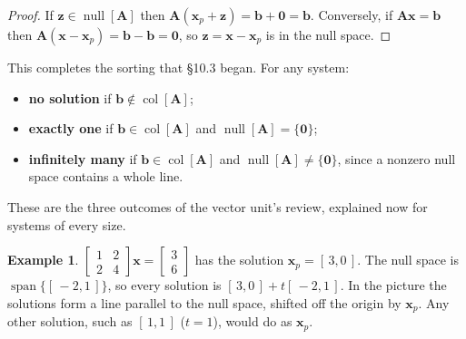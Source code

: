 \documentclass[11pt]{article}
\theoremstyle{plain}
\theoremstyle{definition}
\newtheorem{ex}{Example}[section]
\theoremstyle{remark}
\newcommand{\vc}[1]{\mathbf{#1}}
\newcommand{\mt}[1]{\mathbf{#1}}
\newcommand{\colsp}[1]{\operatorname{col}[#1]}
\newcommand{\nullsp}[1]{\operatorname{null}[#1]}
\DeclareMathOperator{\spanop}{span}
\begin{document}
\begin{proof}
If $\vc{z}\in\nullsp{\mt{A}}$ then
$\mt{A}(\vc{x}_p+\vc{z})=\vc{b}+\vc{0}=\vc{b}$. Conversely, if
$\mt{A}\vc{x}=\vc{b}$ then $\mt{A}(\vc{x}-\vc{x}_p)=\vc{b}-\vc{b}=\vc{0}$, so
$\vc{z}=\vc{x}-\vc{x}_p$ is in the null space.
\end{proof}

\noindent This completes the sorting that \S10.3 began. For any system:
\begin{itemize}[leftmargin=1.4em,itemsep=2pt]
  \item \textbf{no solution} if $\vc{b}\notin\colsp{\mt{A}}$;
  \item \textbf{exactly one} if $\vc{b}\in\colsp{\mt{A}}$ and
        $\nullsp{\mt{A}}=\{\vc{0}\}$;
  \item \textbf{infinitely many} if $\vc{b}\in\colsp{\mt{A}}$ and
        $\nullsp{\mt{A}}\neq\{\vc{0}\}$, since a nonzero null space contains a
        whole line.
\end{itemize}
These are the three outcomes of the vector unit's review, explained now for
systems of every size.

\begin{ex}
$\begin{bmatrix}1&2\\2&4\end{bmatrix}\vc{x}=\begin{bmatrix}3\\6\end{bmatrix}$
has the solution $\vc{x}_p=[\,3,0\,]$. The null space is
$\spanop\{[\,-2,1\,]\}$, so every solution is $[\,3,0\,]+t[\,-2,1\,]$. In the
picture the solutions form a line parallel to the null space, shifted off the
origin by $\vc{x}_p$. Any other solution, such as $[\,1,1\,]$ ($t=1$), would do
as $\vc{x}_p$.
\end{ex}

\begin{center}
\end{center}
\end{document}
